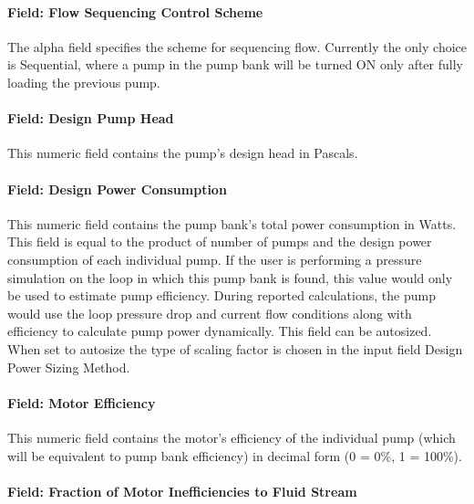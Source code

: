\paragraph{Field: Flow Sequencing Control Scheme}\label{field-flow-sequencing-control-scheme-1}

The alpha field specifies the scheme for sequencing flow. Currently the only choice is Sequential, where a pump in the pump bank will be turned ON only after fully loading the previous pump.

\paragraph{Field: Design Pump Head}\label{field-design-pump-head-4}

This numeric field contains the pump's design head in Pascals.

\paragraph{Field: Design Power Consumption}\label{field-design-power-consumption-4}

This numeric field contains the pump bank's total power consumption in Watts. This field is equal to the product of number of pumps and the design power consumption of each individual pump. If the user is performing a pressure simulation on the loop in which this pump bank is found, this value would only be used to estimate pump efficiency. During reported calculations, the pump would use the loop pressure drop and current flow conditions along with efficiency to calculate pump power dynamically. This field can be autosized. When set to autosize the type of scaling factor is chosen in the input field Design Power Sizing Method.

\paragraph{Field: Motor Efficiency}\label{field-motor-efficiency-4}

This numeric field contains the motor's efficiency of the individual pump (which will be equivalent to pump bank efficiency) in decimal form (0 = 0\%, 1 = 100\%).

\paragraph{Field: Fraction of Motor Inefficiencies to Fluid Stream}\label{field-fraction-of-motor-inefficiencies-to-fluid-stream-4}

